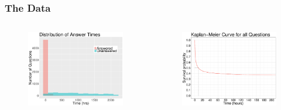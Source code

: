 \documentclass{beamer}
\begin{document}
\begin{frame}

\frametitle{The Data}
  
  \begin{columns}
      \begin{column}{0.5\textwidth}
          \begin{figure}
            \includegraphics[width = 1.0\textwidth]{answersdist} 
          \end{figure}
      \end{column}
      \begin{column}{0.5\textwidth}
          \begin{figure}
            \includegraphics[width = 1.0\textwidth]{kmcurve}
          \end{figure}
      \end{column}
  \end{columns}
  

\end{frame}
\end{document}
